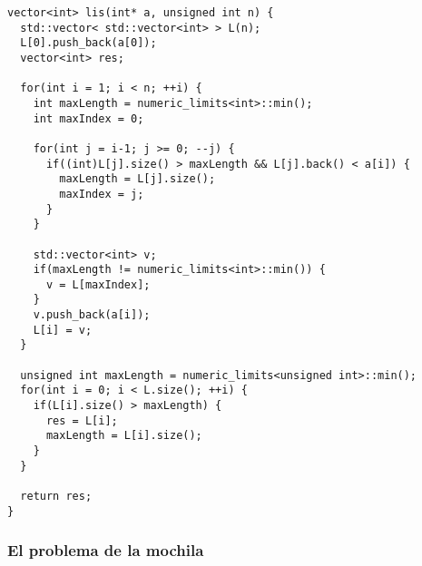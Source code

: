 \begin{center}
\begin{minipage}{1.15\textwidth}
\begin{lstlisting}[frame=lrtb]
vector<int> lis(int* a, unsigned int n) {
  std::vector< std::vector<int> > L(n);
  L[0].push_back(a[0]);
  vector<int> res;

  for(int i = 1; i < n; ++i) {
    int maxLength = numeric_limits<int>::min();
    int maxIndex = 0;

    for(int j = i-1; j >= 0; --j) {
      if((int)L[j].size() > maxLength && L[j].back() < a[i]) {
        maxLength = L[j].size();
        maxIndex = j;
      }
    }
    
    std::vector<int> v;
    if(maxLength != numeric_limits<int>::min()) {
      v = L[maxIndex];      
    }
    v.push_back(a[i]);
    L[i] = v;
  }

  unsigned int maxLength = numeric_limits<unsigned int>::min();
  for(int i = 0; i < L.size(); ++i) {
    if(L[i].size() > maxLength) {
      res = L[i];
      maxLength = L[i].size();
    }
  }

  return res;
}
\end{lstlisting}
\end{minipage}
\end{center}


\newpage
\subsubsection{El problema de la mochila}